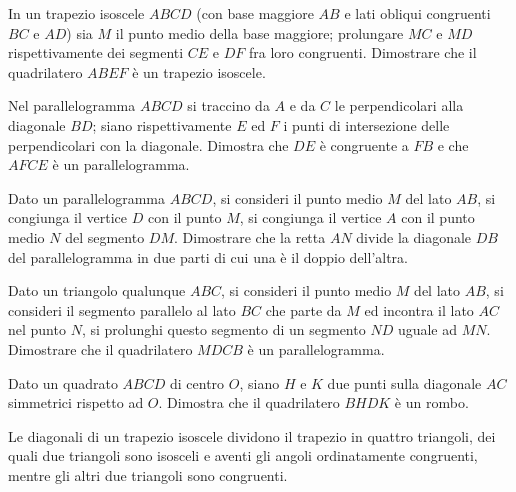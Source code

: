 \begin{multicols}{2}
\begin{esercizio}
\label{ese:4.43}
In un trapezio isoscele \(ABCD\) (con base maggiore \(AB\) e lati obliqui 
congruenti \(BC\) e \(AD\)) sia \(M\) il punto medio della base maggiore; 
prolungare \(MC\) e \(MD\) rispettivamente dei segmenti \(CE\) e \(DF\) fra 
loro congruenti. Dimostrare che il quadrilatero \(ABEF\) è un trapezio 
isoscele.
\end{esercizio}

\begin{esercizio}
\label{ese:4.44}
Nel parallelogramma \(ABCD\) si traccino da \(A\) e da \(C\) le 
perpendicolari alla diagonale \(BD\); siano rispettivamente \(E\) ed \(F\) 
i punti di intersezione delle perpendicolari con la diagonale. 
Dimostra che \(DE\) è congruente a \(FB\) e che \(AFCE\) è un 
parallelogramma.
\end{esercizio}

\begin{esercizio}
\label{ese:4.45}
Dato un parallelogramma \(ABCD\), si consideri il punto medio \(M\) del 
lato \(AB\), si congiunga il vertice \(D\) con il punto \(M\), si congiunga 
il vertice \(A\) con il punto medio \(N\) del segmento \(DM\). Dimostrare 
che la retta \(AN\) divide la diagonale \(DB\) del parallelogramma in due 
parti di cui una è il doppio dell'altra.	
\end{esercizio}

\begin{esercizio}
\label{ese:4.46}
Dato un triangolo qualunque \(ABC\), si consideri il punto medio \(M\) 
del lato \(AB\), si consideri il segmento parallelo al lato \(BC\) che 
parte da \(M\) ed incontra il lato \(AC\) nel punto \(N\), si prolunghi 
questo segmento di un segmento \(ND\) uguale ad \(MN\). Dimostrare che il 
quadrilatero \(MDCB\) è un parallelogramma.
\end{esercizio}

\begin{esercizio}
\label{ese:4.47}
Dato un quadrato \(ABCD\) di centro \(O\), siano \(H\) e \(K\) due punti 
sulla diagonale \(AC\) simmetrici rispetto ad \(O\). Dimostra che il 
quadrilatero \(BHDK\) è un rombo.
\end{esercizio}

\begin{esercizio}
\label{ese:4.48}
Le diagonali di un trapezio isoscele dividono il trapezio in quattro 
triangoli, dei quali due triangoli sono isosceli e aventi gli angoli 
ordinatamente congruenti, mentre gli altri due triangoli sono 
congruenti.
\end{esercizio}


\end{multicols}
